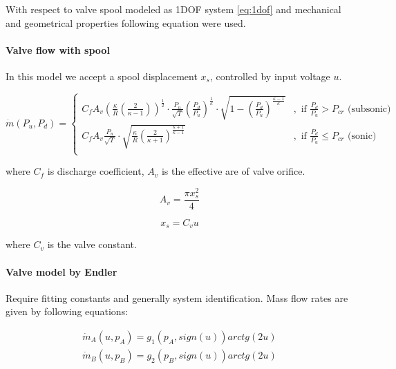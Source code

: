 With respect to valve spool modeled as 1DOF system \ref{eq:1dof} and
mechanical and geometrical properties following equation were used.

\paragraph{Valve flow with spool}
In this model we accept a spool displacement $x_s$, controlled by input
voltage $u$.

\begin{equation}
    \dot{m}(P_u, P_d) = 
    \begin{cases}
        C_f A_v
        \left(\frac{\kappa}{R}\left(\frac{2}{\kappa-1}\right)\right)^{\frac{1}{2}}
        \cdot
        \frac{P_u}{\sqrt{T}}\left(\frac{P_d}{P_u}\right)^{\frac{1}{\kappa}}
        \cdot 
        \sqrt{1 - \left(\frac{P_d}{P_u}\right)^{\frac{\kappa-1}{\kappa}}} &,
            \text{ if } \frac{P_d}{P_u}>P_{cr} \text{ (subsonic)} \\
        C_f A_v \frac{P_u}{\sqrt{T}}\cdot \sqrt{\frac{\kappa}{R}
        \left(\frac{2}{\kappa + 1}\right)^{\frac{\kappa+1}{\kappa-1}}} &,
            \text{ if }  \frac{P_d}{P_u} \le P_{cr} \text{ (sonic)} \\
    \end{cases}
    \label{eq:valve_2}
\end{equation}

where $C_f$ is discharge coefficient, $A_v$ is the effective are of valve
orifice.

\begin{equation}
    A_v = \frac{\pi x_s^2}{4}
    \label{eq:A_v}
\end{equation}

\begin{equation}
    x_s = C_v u
    \label{eq:x_s}
\end{equation}

where $C_v$ is the valve constant.

\paragraph{Valve model by Endler}
Require fitting constants and generally system identification.
Mass flow rates are given by following equations:


\begin{equation}
    \begin{aligned}
        \dot{m}_A(u, p_A) = g_1(p_A, sign(u))arctg(2u) \\
        \dot{m}_B(u, p_B) = g_2(p_B, sign(u))arctg(2u)
    \end{aligned}
\end{equation}

